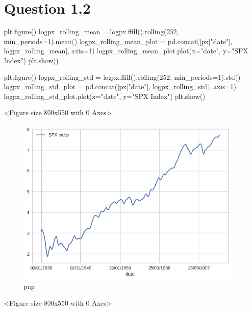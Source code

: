 \hypertarget{question-1.2}{%
\section{Question 1.2}\label{question-1.2}}

\begin{python}[language=Python]
plt.figure()
logpx_rolling_mean = logpx.ffill().rolling(252, min_periods=1).mean() 
logpx_rolling_mean_plot = pd.concat([px["date"], logpx_rolling_mean], axis=1)
logpx_rolling_mean_plot.plot(x="date", y="SPX Index")
plt.show()

plt.figure()
logpx_rolling_std = logpx.ffill().rolling(252, min_periods=1).std()
logpx_rolling_std_plot = pd.concat([px["date"], logpx_rolling_std], axis=1)
logpx_rolling_std_plot.plot(x="date", y="SPX Index")
plt.show()
\end{python}

\begin{python}
<Figure size 800x550 with 0 Axes>
\end{python}

\begin{figure}[h]
\centering
\includegraphics[scale=0.75]{ProcessingStockPriceData_files/ProcessingStockPriceData_5_1.png}
\caption{png}
\end{figure}

\begin{python}
<Figure size 800x550 with 0 Axes>
\end{python}

